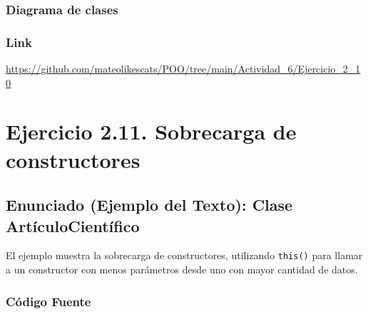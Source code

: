 \documentclass[a4paper]{article} %
\newcommand{\umlclass}[7]{%
  \node[inner sep=0pt, outer sep=0pt, drop shadow={opacity=0.25, shadow xshift=2pt, shadow yshift=-2pt}] (#1) at #2 {%
    \scriptsize\sffamily
    \renewcommand{\arraystretch}{1.10}%
    \setlength{\tabcolsep}{4pt}%
    \begin{tabular}{|L{#3}|}
      \hline
      \rowcolor{#4}\multicolumn{1}{|c|}{\bfseries #5}\\
      \hline
      #6\\
      \hline
      #7\\
      \hline
    \end{tabular}%
  };%
}
\begin{document}
\subsubsection{Diagrama de clases}
\begin{center}
\end{center}

\subsubsection{Link}
\url{https://github.com/mateolikescats/POO/tree/main/Actividad_6/Ejercicio_2_10}


\newpage
\section{Ejercicio 2.11. Sobrecarga de constructores}

\subsection{Enunciado (Ejemplo del Texto): Clase ArtículoCientífico}
El ejemplo muestra la sobrecarga de constructores, utilizando \texttt{this()} para llamar a un constructor con menos parámetros desde uno con mayor cantidad de datos.

\subsubsection{Código Fuente}

\end{document}
